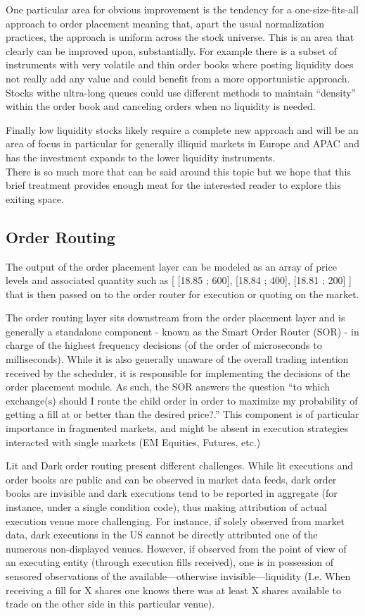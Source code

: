 One particular area for obvious improvement is the tendency for a one-size-fits-all approach to order placement meaning that, apart the usual normalization practices, the approach is uniform across the stock universe. This is an area that clearly can be improved upon, substantially. For example there is a subset of instruments with very volatile and thin order books where posting liquidity does not really add any value and could benefit from a more opportunistic approach. Stocks withe ultra-long queues could use different methods to maintain ``density'' within the order book and canceling orders when no liquidity is needed.

Finally low liquidity stocks likely require a complete new approach and will be an area of focus in particular for generally illiquid markets in Europe and APAC and has the investment expands to the lower liquidity instruments.\\

There is so much more that can be said around this topic but we hope that this brief treatment provides enough meat for the interested reader to explore this exiting space.

\subsection{Order Routing}
The output of the order placement layer can be modeled as an array of price levels and associated quantity such as [ [18.85 ; 600], [18.84 ; 400], [18.81 ; 200] ] that is then passed on to the order router for execution or quoting on the market.


The order routing layer sits downstream from the order placement layer and is generally a standalone component - known as the Smart Order Router (SOR) - in charge of the highest frequency decisions (of the order of microseconds to milliseconds). While it is also generally unaware of the overall trading intention received by the scheduler, it is responsible for implementing the decisions of the order placement module. As such, the SOR answers the question ``to which exchange(s) should I route the child order in order to maximize my probability of getting a fill at or better than the desired price?.'' This component is of particular importance in fragmented markets, and might be absent in execution strategies interacted with single markets (EM Equities, Futures, etc.)


Lit and Dark order routing present different challenges. While lit executions and order books are public and can be observed in market data feeds, dark order books are invisible and dark executions tend to be reported in aggregate (for instance, under a single condition code), thus making attribution of actual execution venue more challenging. For instance, if solely observed from market data, dark executions in the US cannot be directly attributed one of the numerous non-displayed venues. However, if observed from the point of view of an executing entity (through execution fills received), one is in possession of sensored observations of the available---otherwise invisible---liquidity (I.e. When receiving a fill for X shares one knows there was at least X shares available to trade on the other side in this particular venue). 



